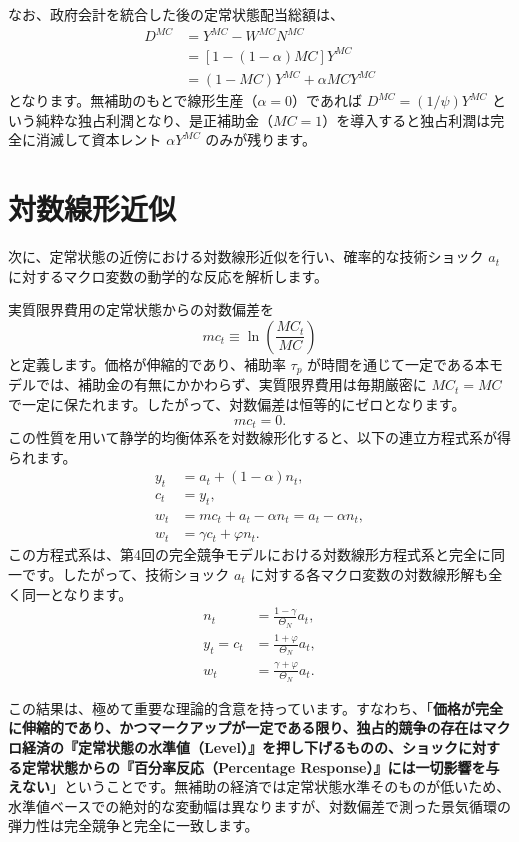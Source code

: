 \documentclass[
  japanese,
  lualatex,
  ja=standard,
  12pt,
  a4paper]{ltjsarticle}
\begin{document}
なお、政府会計を統合した後の定常状態配当総額は、 \[
\begin{aligned}
D^{MC} &= Y^{MC} - W^{MC} N^{MC}\\
&= \left[ 1 - (1-\alpha)MC \right] Y^{MC}\\
&= (1 - MC) Y^{MC} + \alpha MC Y^{MC}
\end{aligned}
\] となります。無補助のもとで線形生産（\(\alpha=0\)）であれば
\(D^{MC} = (1/\psi)Y^{MC}\)
という純粋な独占利潤となり、是正補助金（\(MC=1\)）を導入すると独占利潤は完全に消滅して資本レント
\(\alpha Y^{MC}\) のみが残ります。

\section{対数線形近似}\label{ux5bfeux6570ux7ddaux5f62ux8fd1ux4f3c}

次に、定常状態の近傍における対数線形近似を行い、確率的な技術ショック
\(a_t\) に対するマクロ変数の動学的な反応を解析します。

実質限界費用の定常状態からの対数偏差を \[
mc_t \equiv \ln\left( \frac{MC_t}{MC} \right)
\] と定義します。価格が伸縮的であり、補助率 \(\tau_p\)
が時間を通じて一定である本モデルでは、補助金の有無にかかわらず、実質限界費用は毎期厳密に
\(MC_t = MC\)
で一定に保たれます。したがって、対数偏差は恒等的にゼロとなります。 \[
mc_t = 0.
\]
この性質を用いて静学的均衡体系を対数線形化すると、以下の連立方程式系が得られます。
\[
\begin{aligned}
y_t &= a_t + (1-\alpha) n_t,\\
c_t &= y_t,\\
w_t &= mc_t + a_t - \alpha n_t = a_t - \alpha n_t,\\
w_t &= \gamma c_t + \varphi n_t.
\end{aligned}
\]
この方程式系は、第4回の完全競争モデルにおける対数線形方程式系と完全に同一です。したがって、技術ショック
\(a_t\) に対する各マクロ変数の対数線形解も全く同一となります。 \[
\begin{aligned}
n_t &= \frac{1-\gamma}{\Theta_N} a_t,\\
y_t = c_t &= \frac{1+\varphi}{\Theta_N} a_t,\\
w_t &= \frac{\gamma+\varphi}{\Theta_N} a_t.
\end{aligned}
\]

この結果は、極めて重要な理論的含意を持っています。すなわち、「\textbf{価格が完全に伸縮的であり、かつマークアップが一定である限り、独占的競争の存在はマクロ経済の『定常状態の水準値（Level）』を押し下げるものの、ショックに対する定常状態からの『百分率反応（Percentage
Response）』には一切影響を与えない}」ということです。無補助の経済では定常状態水準そのものが低いため、水準値ベースでの絶対的な変動幅は異なりますが、対数偏差で測った景気循環の弾力性は完全競争と完全に一致します。
\end{document}
